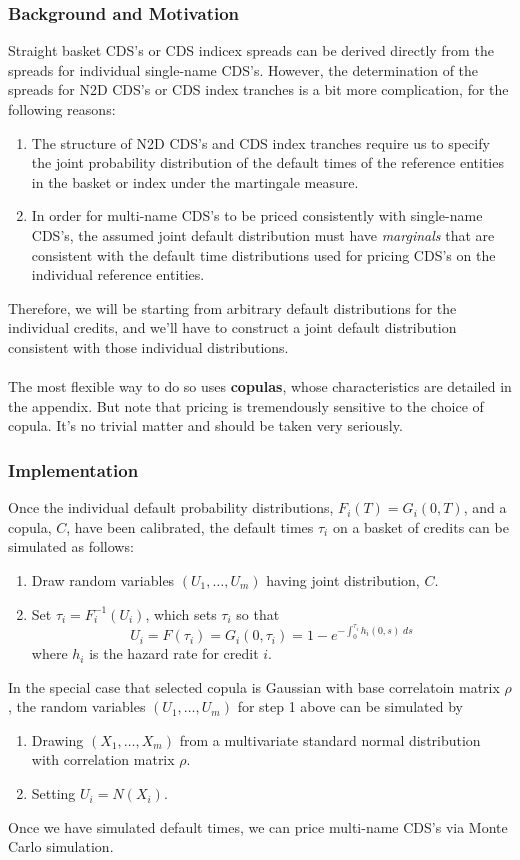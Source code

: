 \documentclass[a4paper,12pt]{scrartcl}
\begin{document}
\subsubsection{Background and Motivation}
Straight basket CDS's or CDS indicex spreads can be derived directly
from the spreads for individual single-name CDS's. However, the 
determination of the spreads for N2D CDS's or CDS index tranches is a
bit more complication, for the following reasons:
\begin{enumerate}
   \item The structure of N2D CDS's and CDS index tranches
      require us to specify the joint probability distribution of
      the default times of the reference entities in the basket or index
      under the martingale measure.
   \item In order for multi-name CDS's to be priced consistently with
      single-name CDS's, the assumed joint default distribution must
      have \emph{marginals} that are consistent with the default time
      distributions used for pricing CDS's on the individual 
      reference entities.
\end{enumerate}
Therefore, we will be starting from arbitrary default distributions for
the individual credits, and we'll have to construct a joint default 
distribution consistent with those individual distributions.
\\
\\
The most flexible way to do so uses \textbf{copulas}, whose 
characteristics are detailed in the appendix. But note that pricing
is tremendously sensitive to the choice of copula. It's no trivial
matter and should be taken very seriously.

\subsubsection{Implementation}

Once the individual default probability distributions, $F_i(T) = 
G_i(0,T)$, and a copula, $C$, have been calibrated, the default times
$\tau_i$ on a basket of credits can be simulated as follows:
\begin{enumerate}
   \item Draw random variables $(U_1, \ldots, U_m)$ having joint 
      distribution, $C$.
   \item Set $\tau_i = F_i^{-1}(U_i)$, which sets $\tau_i$ so that 
      \[ U_i = F(\tau_i) = G_i(0,\tau_i) = 1- e^{-\int^{\tau_i}_0
      h_i(0,s)\; ds} \]
      where $h_i$ is the hazard rate for credit $i$.
\end{enumerate}
In the special case that selected copula is Gaussian with base 
correlatoin matrix $\rho$, the random variables $(U_1, \ldots, U_m)$ for
step 1 above can be simulated by 
\begin{enumerate}
   \item Drawing $(X_1, \ldots, X_m)$ from a multivariate standard 
      normal distribution with correlation matrix $\rho$.
   \item Setting $U_i = N(X_i)$.
\end{enumerate}
Once we have simulated default times, we can price multi-name CDS's
via Monte Carlo simulation.
\end{document}
